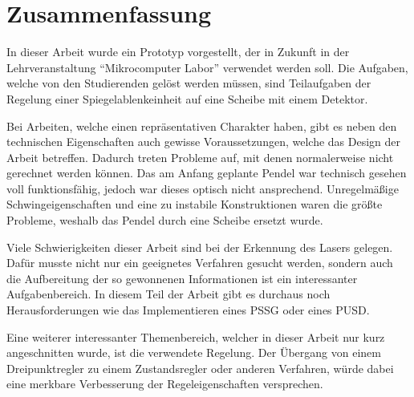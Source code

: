 \chapter{Zusammenfassung}
\label{chap:zusammenfassung}

In dieser Arbeit wurde ein Prototyp vorgestellt, der in Zukunft in der Lehrveranstaltung "`Mikrocomputer Labor"' verwendet werden soll.
Die Aufgaben, welche von den Studierenden gelöst werden müssen, sind Teilaufgaben der Regelung einer Spiegelablenkeinheit auf eine Scheibe mit einem Detektor.

Bei Arbeiten, welche einen repräsentativen Charakter haben, gibt es neben den technischen Eigenschaften auch gewisse Voraussetzungen, welche das Design der Arbeit betreffen.
Dadurch treten Probleme auf, mit denen normalerweise nicht gerechnet werden können.
Das am Anfang geplante Pendel war technisch gesehen voll funktionsfähig, jedoch war dieses optisch nicht ansprechend.
Unregelmäßige Schwingeigenschaften und eine zu instabile Konstruktionen waren die größte Probleme, weshalb das Pendel durch eine Scheibe ersetzt wurde.

Viele Schwierigkeiten dieser Arbeit sind bei der Erkennung des Lasers gelegen.
Dafür musste nicht nur ein geeignetes Verfahren gesucht werden, sondern auch die Aufbereitung der so gewonnenen Informationen ist ein interessanter Aufgabenbereich.
In diesem Teil der Arbeit gibt es durchaus noch Herausforderungen wie das Implementieren eines PSSG oder eines PUSD.

Eine weiterer interessanter Themenbereich, welcher in dieser Arbeit nur kurz angeschnitten wurde, ist die verwendete Regelung.
Der Übergang von einem Dreipunktregler zu einem Zustandsregler oder anderen Verfahren, würde dabei eine merkbare Verbesserung der Regeleigenschaften versprechen.

